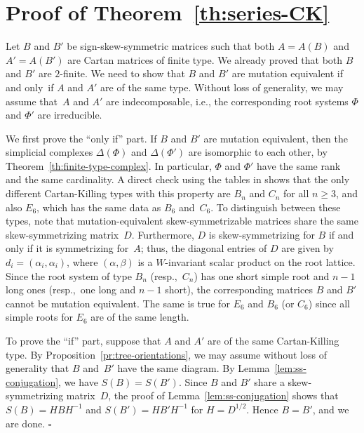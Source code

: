 \documentclass[letterpaper]{amsart}
\numberwithin{equation}{section}
\theoremstyle{definition}
\newcommand{\credit}[1]{\smallskip\noindent {\textbf{#1.\ }}}
\def\endproof{\hfill$\square$\medskip}
\begin{document}
\pagebreak[2] 
 
\section{Proof of 
  Theorem~\ref{th:series-CK} 
} 
\label{sec:proof-CK-exactly} 
 
 
Let $B$ and $B'$ be sign-skew-symmetric matrices such that both $A\!=\! A(B)$ 
and~$A'\!=\! A(B')$ are Cartan matrices of finite type. 
We already proved that both $B$ and $B'$ are $2$-finite. 
We need to show that $B$ and  $B'$ are mutation equivalent if and 
only~if $A$ and $A'$ are of the same %
type. 
Without loss of generality, we may assume that~$A$ and $A'$ are 
indecomposable, i.e., the corresponding root systems $\Phi$ and 
$\Phi'$ are irreducible. 
 
We first prove the ``only if'' part. 
If $B$ and $B'$ are mutation 
equivalent, then the simplicial complexes $\Delta (\Phi)$ and 
$\Delta (\Phi')$ are isomorphic to each other, 
by Theorem~\ref{th:finite-type-complex}. 
In particular, $\Phi$ and $\Phi'$ have the same rank and the same cardinality. 
A direct check using the tables in \cite{bourbaki} shows 
that the only different Cartan-Killing types with this property 
are $B_n$ and $C_n$ for all $n \geq 3$, and also $E_6$, which has 
the same data as $B_6$ and~$C_6$. 
To distinguish between these types, note that 
mutation-equivalent skew-symmetrizable matrices 
share the same skew-symmetrizing matrix~$D$. 
Furthermore, $D$ is skew-symmetrizing for $B$ if and only if 
it is symmetrizing for~$A$; thus, the diagonal entries of $D$ are given by 
$d_i = (\alpha_i,\alpha_i)$, where $(\alpha, \beta)$ is a 
$W$-invariant scalar product on the root lattice. 
Since the root system of type $B_n$ (resp.,~$C_n$) 
has one short simple root and $n-1$ long ones 
(resp.,~one long and $n-1$ short), the 
corresponding matrices $B$ and $B'$ cannot be mutation equivalent. 
The same is true for $E_6$ and $B_6$ (or $C_6$) since all simple 
roots for $E_6$ are of the same length. 
 
 
To prove the ``if'' part, 
suppose that 
$A$ and $A'$ are of the same Cartan-Killing type. 
By Proposition~\ref{pr:tree-orientations}, we may assume without 
loss of generality that $B$ and~$B'$ have the same diagram. 
By Lemma~\ref{lem:ss-conjugation}, we have $S(B) = S(B')$. 
Since $B$ and $B'$ share a skew-symmetrizing matrix~$D$, 
the proof of Lemma~\ref{lem:ss-conjugation} shows that 
$S(B) = HBH^{-1}$ and $S(B') = HB'H^{-1}$ for $H = D^{1/2}$. 
Hence $B = B'$, and we are done. 
\endproof 
 
\end{document}
